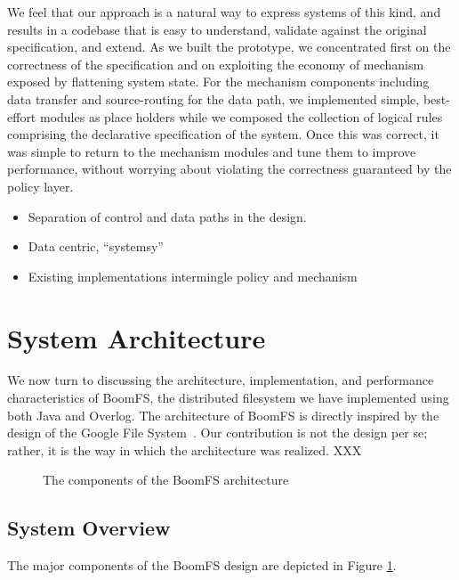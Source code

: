 \documentclass{article}
\begin{document}
We feel that our approach is a natural way to express systems of this kind, and results in a codebase that is easy to understand, validate against the original specification, and extend.  As we built the prototype, we concentrated first on the correctness of the specification and on exploiting the economy of mechanism exposed by flattening system state.  For the mechanism components including data transfer and source-routing for the data path, we implemented simple, best-effort modules as place holders while we composed the collection of logical rules comprising the declarative specification of the system.  Once this was correct, it was simple to return to the mechanism modules and tune them to improve performance, without worrying about violating the correctness guaranteed by the policy layer.




\begin{itemize}
\item
  Separation of control and data paths in the design.

\item
  Data centric, ``systemsy''

\item
  Existing implementations intermingle policy and mechanism
\end{itemize}

\section{System Architecture}
\label{system-arch}
We now turn to discussing the architecture, implementation, and
performance characteristics of BoomFS, the distributed filesystem we
have implemented using both Java and Overlog. The architecture of
BoomFS is directly inspired by the design of the Google File
System~\cite{gfs}. Our contribution is not the design per se; rather,
it is the way in which the architecture was realized. XXX

\begin{figure}
\centering
{}
\caption{The components of the BoomFS architecture}
\label{fig:system-arch}
\end{figure}

\subsection{System Overview}
The major components of the BoomFS design are depicted in Figure
\ref{fig:system-arch}. %
\end{document}
